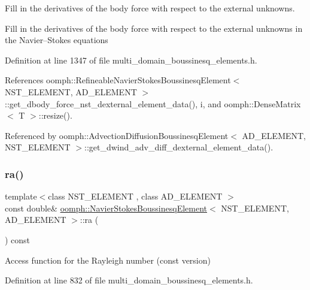 Fill in the derivatives of the body force with respect to the external unknowns. 

Fill in the derivatives of the body force with respect to the external unknowns in the Navier--Stokes equations 

Definition at line 1347 of file multi\+\_\+domain\+\_\+boussinesq\+\_\+elements.\+h.



References oomph\+::\+Refineable\+Navier\+Stokes\+Boussinesq\+Element$<$ N\+S\+T\+\_\+\+E\+L\+E\+M\+E\+N\+T, A\+D\+\_\+\+E\+L\+E\+M\+E\+N\+T $>$\+::get\+\_\+dbody\+\_\+force\+\_\+nst\+\_\+dexternal\+\_\+element\+\_\+data(), i, and oomph\+::\+Dense\+Matrix$<$ T $>$\+::resize().



Referenced by oomph\+::\+Advection\+Diffusion\+Boussinesq\+Element$<$ A\+D\+\_\+\+E\+L\+E\+M\+E\+N\+T, N\+S\+T\+\_\+\+E\+L\+E\+M\+E\+N\+T $>$\+::get\+\_\+dwind\+\_\+adv\+\_\+diff\+\_\+dexternal\+\_\+element\+\_\+data().

\mbox{\label{classoomph_1_1NavierStokesBoussinesqElement_a3318acc1306c60bd13b3bfe8e15a2fa5}} 
\subsubsection{\texorpdfstring{ra()}{ra()}}
{\footnotesize\ttfamily template$<$class N\+S\+T\+\_\+\+E\+L\+E\+M\+E\+NT , class A\+D\+\_\+\+E\+L\+E\+M\+E\+NT $>$ \\
const double\& \hyperlink{classoomph_1_1NavierStokesBoussinesqElement}{oomph\+::\+Navier\+Stokes\+Boussinesq\+Element}$<$ N\+S\+T\+\_\+\+E\+L\+E\+M\+E\+NT, A\+D\+\_\+\+E\+L\+E\+M\+E\+NT $>$\+::ra (\begin{DoxyParamCaption}{ }\end{DoxyParamCaption}) const\hspace{0.3cm}{\ttfamily [inline]}}



Access function for the Rayleigh number (const version) 



Definition at line 832 of file multi\+\_\+domain\+\_\+boussinesq\+\_\+elements.\+h.

\mbox{\label{classoomph_1_1NavierStokesBoussinesqElement_ac822ef74e7bc0e55c917e58f2cd5a6fe}} 

